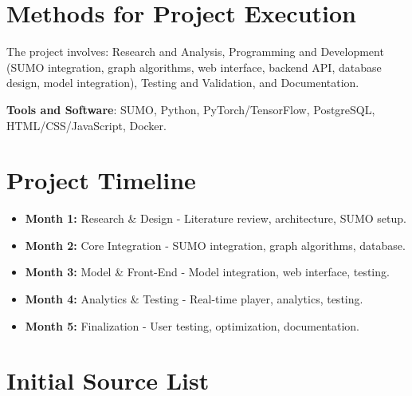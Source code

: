 \documentclass[12pt,a4paper]{article}
\begin{document}
\section{Methods for Project Execution}

The project involves: Research and Analysis, Programming and Development (SUMO integration, graph algorithms, web interface, backend API, database design, model integration), Testing and Validation, and Documentation.

\textbf{Tools and Software}: SUMO, Python, PyTorch/TensorFlow, PostgreSQL, HTML/CSS/JavaScript, Docker.

\section{Project Timeline}

\begin{itemize}[leftmargin=0pt]
\item \textbf{Month 1:} Research \& Design - Literature review, architecture, SUMO setup.
\item \textbf{Month 2:} Core Integration - SUMO integration, graph algorithms, database.
\item \textbf{Month 3:} Model \& Front-End - Model integration, web interface, testing.
\item \textbf{Month 4:} Analytics \& Testing - Real-time player, analytics, testing.
\item \textbf{Month 5:} Finalization - User testing, optimization, documentation.
\end{itemize}

\section{Initial Source List}
\end{document}
